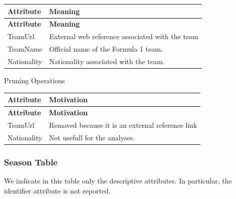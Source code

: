 \documentclass[a4paper,11pt]{article}
\begin{document}
	\begin{longtable}{|p{4cm}|p{10.8cm}|}
		\hline
		\textbf{Attribute} & \textbf{Meaning} \\
		\hline
		\endfirsthead
		
		\hline
		\textbf{Attribute} & \textbf{Meaning} \\
		\hline
		\endhead
		
		TeamUrl & External web reference associated with the team \\ \hline
		
		TeamName & Official name of the Formula 1 team. \\ \hline
		
		Nationality & Nationality associated with the team. \\ \hline
		
	\end{longtable}
	
	
	Pruning Operations
	
	\begin{longtable}{|p{4.4cm}|p{10.8cm}|}
		\hline
		\textbf{Attribute} & \textbf{Motivation} \\
		\hline
		\endfirsthead
		
		\hline
		\textbf{Attribute} & \textbf{Motivation} \\
		\hline
		\endhead
		
		TeamUrl & Removed because it is an external reference link \\ \hline
		
		Nationality & Not usefull for the analyses. \\ \hline
		
	\end{longtable}
	

	\subsubsection{Season Table}
	
	We indicate in this table only the descriptive attributes. In particular, the identifier attribute is not reported.
	
\end{document}
